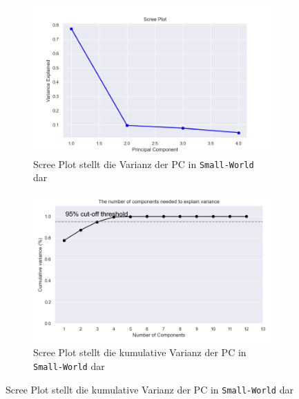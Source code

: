 \begin{figure}
    \ContinuedFloat
    \begin{subfigure}{.5\textwidth}
        \includegraphics[width=\textwidth]{images/30_results/smallworld-scree.png}
        \caption{Scree Plot stellt die Varianz der PC in \texttt{Small-World} dar}
        \label{fig:scree-smallworld}
    \end{subfigure}%
    \begin{subfigure}{.5\textwidth}
        \includegraphics[width=\textwidth]{images/30_results/smallworld-scree-cum.png}
        \caption{Scree Plot stellt die kumulative Varianz der PC in \texttt{Small-World} dar}
        \label{fig:scree-cum-smallworld}
    \end{subfigure}


\end{figure}
